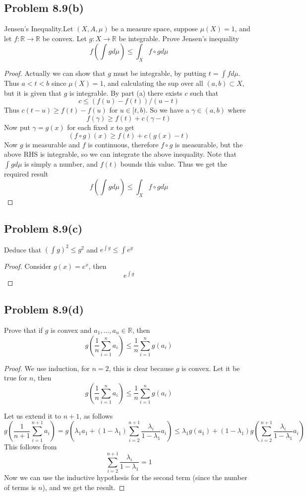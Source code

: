 \documentclass{article}[12pt]
\newtheorem{proof}{Proof}
\def\RR{\mathbb R}
\begin{document}
\subsection*{Problem 8.9(b)}Jensen's Inequality.Let $(X,A,\mu)$ be a measure space, suppose $\mu(X)=1$,
and let $f:\RR\to\RR$ be convex. Let $g:X\to\RR$ be integrable. Prove Jensen's inequality
\[
f(\int g d\mu) \le \int_X f\circ g d\mu
\]
\begin{proof}
Actually we can show that $g$ must be integrable, by putting $t=\int fd\mu$.
Thus $a<t<b$ since $\mu(X)=1$, and calculating the sup over 
all $(a,b)\subset X$, but it is given that $g$ is integrable. By part (a)
there exists $c$ such that
\[
c \le (f(u)-f(t))/(u-t)
\]
Thus $c(t-u) \ge f(t)-f(u)$ for $u\in [t,b)$. So we have a $\gamma\in (a,b)$
where
\[
f(\gamma) \ge f(t) + c(\gamma-t)
\]
Now put $\gamma=g(x)$ for each fixed $x$ to get
\[
(f \circ g)(x) \ge f(t) + c(g(x)-t)
\]
Now $g$ is measurable and $f$ is continuous, therefore $f\circ g$ is
measurable, but the above RHS is integrable, so we can integrate the above
inequality. Note that $\int g d\mu$ is simply a number, and $f(t)$ bounds 
this value. 
Thus we get the required result
\[
f(\int g d\mu) \le \int_X f\circ g d\mu
\]


\end{proof}


\subsection*{Problem 8.9(c)}Deduce that $(\int g)^2 \le g^2$ and $e^{\int g} \le \int e^g$
\begin{proof}
  Consider $g(x)=e^x$, then
  \[
  e^{\int g}
  \]
  
\end{proof}


\subsection*{Problem 8.9(d)}Prove that if $g$ is convex and $a_1,\ldots,a_n\in \RR$, then
\[
g(\frac{1}{n} \sum_{i=1}^n a_i ) \le \frac{1}{n} \sum_{i=1}^n g(a_i)
\]

\begin{proof}
We use induction, for $n=2$, this is clear because $g$ is convex.
Let it be true for $n$, then
\[
g(\frac{1}{n} \sum_{i=1}^n a_i ) \le \frac{1}{n} \sum_{i=1}^n g(a_i)
\]

Let us extend it to $n+1$, as follows
\[
g(\frac{1}{n+1} \sum_{i=1}^{n+1} a_i ) = 
g(\lambda_1 a_1 + (1-\lambda_1)\sum_{i=2}^{n+1} \frac{\lambda_i}{1-\lambda_1}a_i)
\le \lambda_1 g(a_1) + (1-\lambda_1)g(\sum_{i=2}^{n+1} \frac{\lambda_i}{1-\lambda_1}a_i)
\]
This follows from
\[
\sum_{i=2}^{n+1} \frac{\lambda_i}{1-\lambda_1}=1
\]
Now we can use the inductive hypothesis for the second term (since
the number of terms is $n$), and we get the result.
\end{proof}
\end{document}
